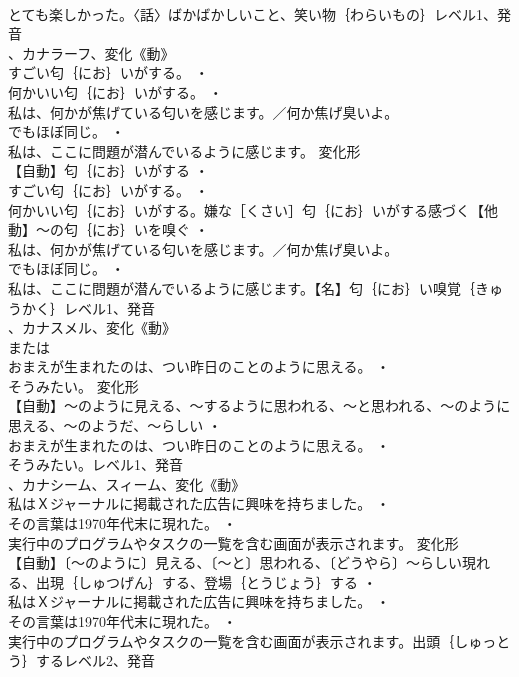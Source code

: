 \documentclass[8pt]{extreport}
\begin{document}
\begin{CJK}{UTF8}{min}
\\	とても楽しかった。〈話〉ばかばかしいこと、笑い物｛わらいもの｝レベル1、発音
\\	、カナラーフ、変化《動》
\\	すごい匂｛にお｝いがする。 ・
\\	何かいい匂｛にお｝いがする。 ・
\\	私は、何かが焦げている匂いを感じます。／何か焦げ臭いよ。
\\	でもほぼ同じ。 ・
\\	私は、ここに問題が潜んでいるように感じます。	変化形 
\\	【自動】匂｛にお｝いがする ・
\\	すごい匂｛にお｝いがする。 ・
\\	何かいい匂｛にお｝いがする。嫌な［くさい］匂｛にお｝いがする感づく【他動】～の匂｛にお｝いを嗅ぐ ・
\\	私は、何かが焦げている匂いを感じます。／何か焦げ臭いよ。
\\	でもほぼ同じ。 ・
\\	私は、ここに問題が潜んでいるように感じます。【名】匂｛にお｝い嗅覚｛きゅうかく｝レベル1、発音
\\	、カナスメル、変化《動》
\\	または
\\	おまえが生まれたのは、つい昨日のことのように思える。 ・
\\	そうみたい。	変化形 
\\	【自動】～のように見える、～するように思われる、～と思われる、～のように思える、～のようだ、～らしい ・
\\	おまえが生まれたのは、つい昨日のことのように思える。 ・
\\	そうみたい。レベル1、発音
\\	、カナシーム、スィーム、変化《動》
\\	私はＸジャーナルに掲載された広告に興味を持ちました。 ・
\\	その言葉は1970年代末に現れた。 ・
\\	実行中のプログラムやタスクの一覧を含む画面が表示されます。	変化形 
\\	【自動】〔～のように〕見える、〔～と〕思われる、〔どうやら〕～らしい現れる、出現｛しゅつげん｝する、登場｛とうじょう｝する ・
\\	私はＸジャーナルに掲載された広告に興味を持ちました。 ・
\\	その言葉は1970年代末に現れた。 ・
\\	実行中のプログラムやタスクの一覧を含む画面が表示されます。出頭｛しゅっとう｝するレベル2、発音

\end{CJK}
\end{document}
